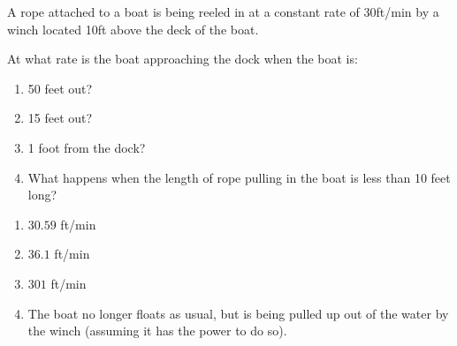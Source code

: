{A rope attached to a boat is being reeled in at a constant rate of 30ft/min by a winch located 10ft above the deck of the boat.

\noindent\begin{minipage}{\linewidth}
\centering
{}
\end{minipage}

At what rate is the boat approaching the dock when the boat is:
\begin{enumerate}
\item	50 feet out?
\item	15 feet out?
\item	1 foot from the dock?
\item	What happens when the length of rope pulling in the boat is less than 10 feet long?
\end{enumerate}
}
{
\begin{enumerate}
\item  $30.59$ ft/min
\item	 $36.1$ ft/min
\item  $301$ ft/min
\item	 The boat no longer floats as usual, but is being pulled up out of the water by the winch (assuming it has the power to do so).	
\end{enumerate}
}

